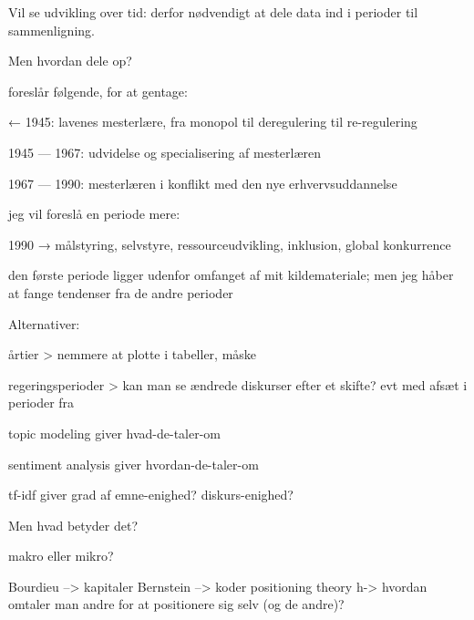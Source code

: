Vil se udvikling over tid: derfor nødvendigt at dele data ind i perioder til sammenligning.

Men hvordan dele op?

\citeauthor{bondergaardHistoricalEmergenceKey2014} foreslår følgende, for at gentage:

← 1945: lavenes mesterlære, fra monopol til deregulering til re-regulering

1945 — 1967: udvidelse og specialisering af mesterlæren

1967 — 1990: mesterlæren i konflikt med den nye erhvervsuddannelse

jeg vil foreslå en periode mere:

1990 → målstyring, selvstyre, ressourceudvikling, inklusion, global konkurrence 

den første periode ligger udenfor omfanget af mit kildemateriale; men jeg håber at fange tendenser fra de andre perioder

Alternativer:

årtier > nemmere at plotte i tabeller, måske

regeringsperioder > kan man se ændrede diskurser efter et skifte? evt med afsæt i perioder fra \citeauthor{bondergaardHistoricalEmergenceKey2014, juulDiskurserOmUngdom2013}



topic modeling giver hvad-de-taler-om

sentiment analysis giver hvordan-de-taler-om

tf-idf giver grad af emne-enighed? diskurs-enighed?

Men hvad betyder det?

makro eller mikro?

Bourdieu --> kapitaler
Bernstein --> koder
positioning theory h-> hvordan omtaler man andre for at positionere sig selv (og de andre)?
